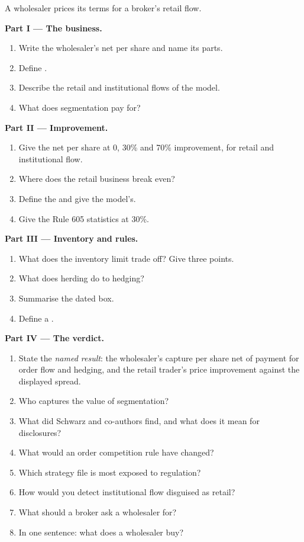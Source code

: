 \begin{problem}\label{pb:hf:retail-wholesaling:1}
A wholesaler prices its terms for a broker's retail flow.

\medskip\noindent\textbf{Part I --- The business.}
\begin{enumerate}
\item Write the wholesaler's net per share and name its parts.
\item Define .
\item Describe the retail and institutional flows of the model.
\item What does segmentation pay for?
\end{enumerate}

\medskip\noindent\textbf{Part II --- Improvement.}
\begin{enumerate}[resume]
\item Give the net per share at 0, 30\% and 70\% improvement, for retail and institutional flow.
\item Where does the retail business break even?
\item Define the  and give the model's.
\item Give the Rule 605 statistics at 30\%.
\end{enumerate}

\medskip\noindent\textbf{Part III --- Inventory and rules.}
\begin{enumerate}[resume]
\item What does the inventory limit trade off? Give three points.
\item What does herding do to hedging?
\item Summarise the dated box.
\item Define a .
\end{enumerate}

\medskip\noindent\textbf{Part IV --- The verdict.}
\begin{enumerate}[resume]
\item State the \emph{named result}: the wholesaler's capture per share net of payment for order flow and hedging, and the retail trader's price
improvement against the displayed spread.
\item Who captures the value of segmentation?
\item What did Schwarz and co-authors find, and what does it mean for disclosures?
\item What would an order competition rule have changed?
\item Which strategy file is most exposed to regulation?
\item How would you detect institutional flow disguised as retail?
\item What should a broker ask a wholesaler for?
\item In one sentence: what does a wholesaler buy?
\end{enumerate}
\end{problem}

